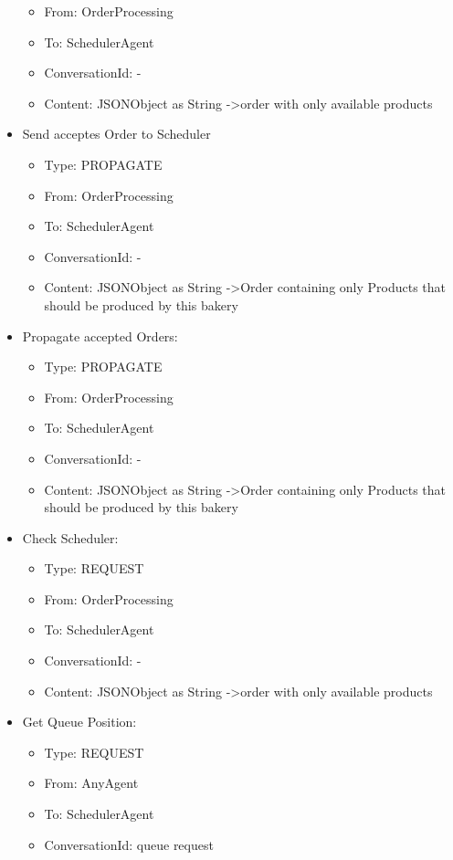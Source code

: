 \documentclass[10pt,a4paper]{article}
\begin{document}
\begin{itemize}
\begin{itemize}
			\item From: OrderProcessing
			\item To: SchedulerAgent
			\item ConversationId: -
			\item Content: JSONObject as String -\textgreater order with only available products
		\end{itemize}
		\item Send acceptes Order to Scheduler
		\begin{itemize}
			\item Type: PROPAGATE
			\item From: OrderProcessing
			\item To: SchedulerAgent
			\item ConversationId: -
			\item Content: JSONObject as String -\textgreater Order containing only Products that should be produced by this bakery
		\end{itemize}
		\item Propagate accepted Orders:
		\begin{itemize}
			\item Type: PROPAGATE
			\item From: OrderProcessing
			\item To: SchedulerAgent
			\item ConversationId: -
			\item Content: JSONObject as String -\textgreater Order containing only Products that should be produced by this bakery
		\end{itemize}
		\item Check Scheduler:
		\begin{itemize}
			\item Type: REQUEST
			\item From: OrderProcessing
			\item To: SchedulerAgent
			\item ConversationId: -
			\item Content: JSONObject as String -\textgreater order with only available products
		\end{itemize}
		\item Get Queue Position:
		\begin{itemize}
			\item Type: REQUEST
			\item From: AnyAgent
			\item To: SchedulerAgent
			\item ConversationId: \glqq queue request\grqq

\end{itemize}
\end{itemize}
\end{document}
